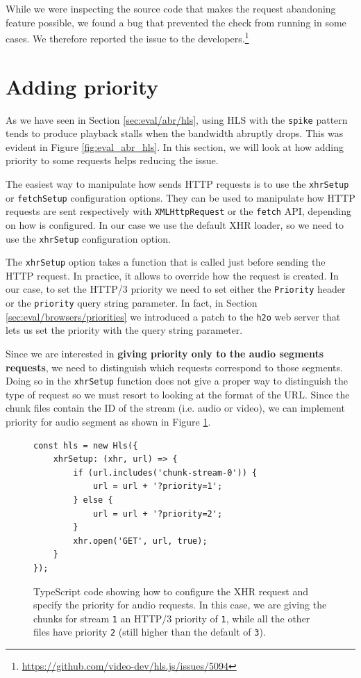 While we were inspecting the source code that makes the request abandoning feature possible, we found a bug that prevented the check from running in some cases. We therefore reported the issue to the \hlsjs{} developers.\footnote{\url{https://github.com/video-dev/hls.js/issues/5094}}

\section{Adding priority}
\label{sec:improvements/priority}

As we have seen in Section \ref{sec:eval/abr/hls}, using HLS with the \texttt{spike} pattern tends to produce playback stalls when the bandwidth abruptly drops. This was evident in Figure \ref{fig:eval_abr_hls}. In this section, we will look at how adding priority to some requests helps reducing the issue.

The easiest way to manipulate how \hlsjs{} sends HTTP requests is to use the \texttt{xhrSetup} or \texttt{fetchSetup} configuration options. They can be used to manipulate how HTTP requests are sent respectively with \texttt{XMLHttpRequest} or the \texttt{fetch} API, depending on how \hlsjs{} is configured. In our case we use the default XHR loader, so we need to use the \texttt{xhrSetup} configuration option.

The \texttt{xhrSetup} option takes a function that is called just before sending the HTTP request. In practice, it allows to override how the request is created. In our case, to set the HTTP/3 priority we need to set either the \texttt{Priority} header or the \texttt{priority} query string parameter. In fact, in Section \ref{sec:eval/browsers/priorities} we introduced a patch to the \texttt{h2o} web server that lets us set the priority with the query string parameter.

Since we are interested in \textbf{giving priority only to the audio segments requests}, we need to distinguish which requests correspond to those segments. Doing so in the \texttt{xhrSetup} function does not give a proper way to distinguish the type of request so we must resort to looking at the format of the URL. Since the chunk files contain the ID of the stream (i.e. audio or video), we can implement priority for audio segment as shown in Figure \ref{fig:hlsjs_xhrsetup}.

\begin{figure}[h]
    \centering
    \begin{verbatim}
const hls = new Hls({
    xhrSetup: (xhr, url) => {
        if (url.includes('chunk-stream-0')) {
            url = url + '?priority=1';
        } else {
            url = url + '?priority=2';
        }
        xhr.open('GET', url, true);
    }
});
    \end{verbatim}
    \caption{TypeScript code showing how to configure the XHR request and specify the priority for audio requests. In this case, we are giving the chunks for stream \texttt{1} an HTTP/3 priority of \texttt{1}, while all the other files have priority \texttt{2} (still higher than the default of \texttt{3}).}
    \label{fig:hlsjs_xhrsetup}
\end{figure}

